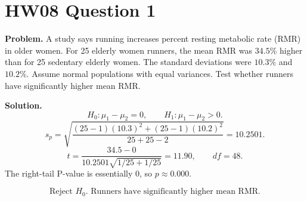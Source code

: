 \documentclass[11pt]{article}
\begin{document}
\section*{HW08 Question 1}

\textbf{Problem.} A study says running increases percent resting metabolic rate (RMR) in older women. For 25 elderly women runners, the mean RMR was \(34.5\%\) higher than for 25 sedentary elderly women. The standard deviations were \(10.3\%\) and \(10.2\%\). Assume normal populations with equal variances. Test whether runners have significantly higher mean RMR.

\textbf{Solution.}
\[
H_0:\mu_1-\mu_2=0,\qquad H_1:\mu_1-\mu_2>0.
\]
\[
s_p=\sqrt{\frac{(25-1)(10.3)^2+(25-1)(10.2)^2}{25+25-2}}=10.2501.
\]
\[
t=\frac{34.5-0}{10.2501\sqrt{1/25+1/25}}=11.90,\qquad df=48.
\]
The right-tail P-value is essentially \(0\), so \(p\approx0.000\).

\[
\boxed{\text{Reject }H_0. \text{ Runners have significantly higher mean RMR.}}
\]
\end{document}
